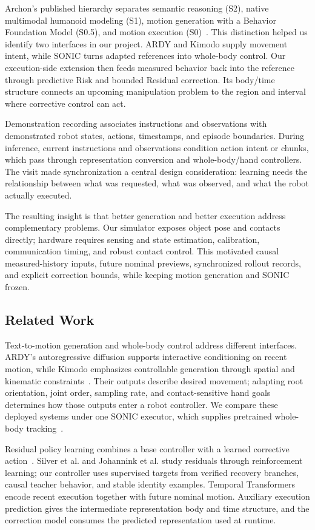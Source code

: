 \documentclass[letterpaper,10pt,conference]{ieeeconf}
\begin{document}
Archon's published hierarchy separates semantic reasoning (S2), native multimodal humanoid modeling (S1), motion generation with a Behavior Foundation Model (S0.5), and motion execution (S0)~\cite{archon_wbi}. This distinction helped us identify two interfaces in our project. ARDY and Kimodo supply movement intent, while SONIC turns adapted references into whole-body control. Our execution-side extension then feeds measured behavior back into the reference through predictive Risk and bounded Residual correction. Its body/time structure connects an upcoming manipulation problem to the region and interval where corrective control can act.

Demonstration recording associates instructions and observations with demonstrated robot states, actions, timestamps, and episode boundaries. During inference, current instructions and observations condition action intent or chunks, which pass through representation conversion and whole-body/hand controllers. The visit made synchronization a central design consideration: learning needs the relationship between what was requested, what was observed, and what the robot actually executed.

The resulting insight is that better generation and better execution address complementary problems. Our simulator exposes object pose and contacts directly; hardware requires sensing and state estimation, calibration, communication timing, and robust contact control. This motivated causal measured-history inputs, future nominal previews, synchronized rollout records, and explicit correction bounds, while keeping motion generation and SONIC frozen.

\subsection{Related Work}
Text-to-motion generation and whole-body control address different interfaces. ARDY's autoregressive diffusion supports interactive conditioning on recent motion, while Kimodo emphasizes controllable generation through spatial and kinematic constraints~\cite{ardy,kimodo}. Their outputs describe desired movement; adapting root orientation, joint order, sampling rate, and contact-sensitive hand goals determines how those outputs enter a robot controller. We compare these deployed systems under one SONIC executor, which supplies pretrained whole-body tracking~\cite{sonic}.

Residual policy learning combines a base controller with a learned corrective action~\cite{residual_policy,residual}. Silver et al. and Johannink et al. study residuals through reinforcement learning; our controller uses supervised targets from verified recovery branches, causal teacher behavior, and stable identity examples. Temporal Transformers~\cite{transformer} encode recent execution together with future nominal motion. Auxiliary execution prediction gives the intermediate representation body and time structure, and the correction model consumes the predicted representation used at runtime.
\end{document}
